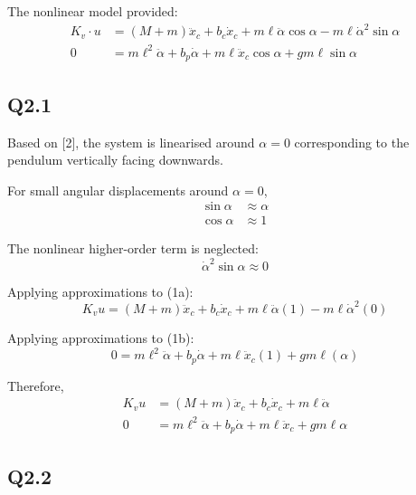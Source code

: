 \documentclass[11pt,a4paper]{article}
\begin{document}
The nonlinear model provided:
\begin{align}
	K_{v} \cdot u &= \left( M + m \right) \ddot{x}_{c} + b_{c} \dot{x}_{c}
	+ m \ell \ddot{\alpha} \cos\alpha
	- m \ell \dot{\alpha}^{2} \sin\alpha \tag{1a} \\
	0 &= m \ell^{2} \ddot{\alpha} + b_{p} \dot{\alpha}
	+ m \ell \ddot{x}_{c} \cos\alpha + g m \ell \sin\alpha \tag{1b}
\end{align}

\subsection*{Q2.1}

Based on [2], the system is linearised around $\alpha = 0$ corresponding to the pendulum
vertically facing downwards.

For small angular displacements around $\alpha = 0$,
\begin{align*}
	\sin\alpha &\approx \alpha \\
	\cos\alpha &\approx 1
\end{align*}

The nonlinear higher-order term is neglected:
\begin{equation*}
	\dot{\alpha}^{2} \sin\alpha \approx 0
\end{equation*}

Applying approximations to (1a):
\begin{equation*}
    K_{v} u = \left( M + m \right) \ddot{x}_{c} + b_{c}\dot{x}_{c} 
	+ m\ell\ddot{\alpha}(1) - m\ell\dot{\alpha}^{2}(0)
\end{equation*}

Applying approximations to (1b):
\begin{equation*}
    0 = m\ell^{2}\ddot{\alpha} + b_{p}\dot{\alpha}
    + m\ell\ddot{x}_{c}(1) + gm\ell(\alpha)
\end{equation*}

Therefore,
\begin{align}
    K_{v}u &= \left( M+m \right)\ddot{x}_{c} + b_{c}\dot{x}_{c}
    + m\ell\ddot{\alpha} \tag{2a} \\
    0 &= m\ell^{2}\ddot{\alpha} + b_{p}\dot{\alpha}
    + m\ell\ddot{x}_{c} + gm\ell\alpha \tag{2b}
\end{align}

\subsection*{Q2.2}
\end{document}
